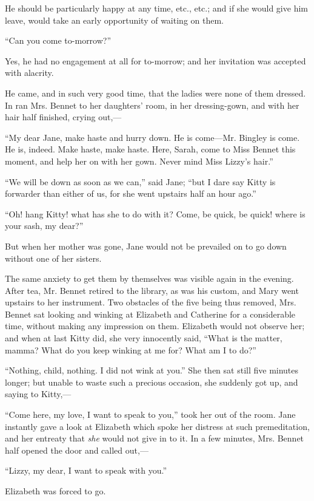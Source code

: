He should be particularly happy at any time, etc., etc.; and if she would give him leave, would take an early opportunity of waiting on them.

``Can you come to-morrow?''

Yes, he had no engagement at all for to-morrow; and her invitation was accepted with alacrity.

He came, and in such very good time, that the ladies were none of them dressed. In ran Mrs. Bennet to her daughters' room, in her dressing-gown, and with her hair half finished, crying out,---

``My dear Jane, make haste and hurry down. He is come---Mr. Bingley is come. He is, indeed. Make haste, make haste. Here, Sarah, come to Miss Bennet this moment, and help her on with her gown. Never mind Miss Lizzy's hair.''

``We will be down as soon as we can,'' said Jane; ``but I dare say Kitty is forwarder than either of us, for she went upstairs half an hour ago.''

``Oh! hang Kitty! what has she to do with it? Come, be quick, be quick! where is your sash, my dear?''

But when her mother was gone, Jane would not be prevailed on to go down without one of her sisters.

The same anxiety to get them by themselves was visible again in the evening. After tea, Mr. Bennet retired to the library, as was his custom, and Mary went upstairs to her instrument. Two obstacles of the five being thus removed, Mrs. Bennet sat looking and winking at Elizabeth and Catherine for a considerable time, without making any impression on them. Elizabeth would not observe her; and when at last Kitty did, she very innocently said, ``What is the matter, mamma? What do you keep winking at me for? What am I to do?''

``Nothing, child, nothing. I did not wink at you.'' She then sat still five minutes longer; but unable to waste such a precious occasion, she suddenly got up, and saying to Kitty,---

``Come here, my love, I want to speak to you,'' took her out of the room. Jane instantly gave a look at Elizabeth which spoke her distress at such premeditation, and her entreaty that \textit{she} would not give in to it. In a few minutes, Mrs. Bennet half opened the door and called out,---

``Lizzy, my dear, I want to speak with you.''

Elizabeth was forced to go.

